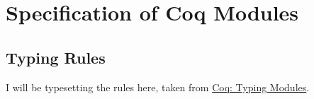\chapter{Specification of Coq Modules}

\section{Typing Rules}

I will be typesetting the rules here, taken from \href{https://coq.inria.fr/refman/language/core/modules.html#typing-modules}{Coq: Typing Modules}.